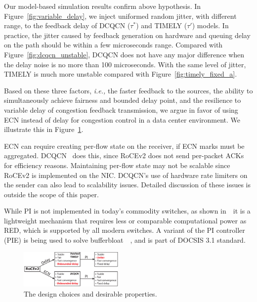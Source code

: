 Our model-based simulation results confirm above hypothesis. In Figure~\ref{fig:variable_delay}, we inject 
uniformed random jitter, with different range, to the feedback delay of DCQCN ($\tau^*$) 
and TIMELY ($\tau '$) models. In practice, the jitter caused by feedback generation on hardware 
and queuing delay on the path should be within a few microseconds range. Compared with 
Figure~\ref{fig:dcqcn_unstable}, DCQCN does not have any major difference when the delay noise is 
no more than 100 microseconds. With the same level of jitter, TIMELY is much more unstable compared
with Figure~\ref{fig:timely_fixed_a}.


Based on these three factors, {\em i.e.,} the faster feedback to the sources, 
the ability to simultaneously achieve fairness and bounded delay point, and the resilience 
to variable delay of congestion feedback transmission, we argue
in favor of using ECN instead of delay for congestion control in a data center
environment. We illustrate this in Figure~\ref{fig:design_choice}.

ECN can require creating per-flow state on the receiver, if ECN marks must be
aggregated. DCQCN~\cite{dcqcn} does this, since RoCEv2 does not send per-packet
ACKs for efficiency reasons. Maintaining per-flow state may not be scalable since
RoCEv2 is implemented on the NIC.  DCQCN's use of hardware rate limiters on the
sender can also lead to scalability issues.  Detailed discussion of these issues
is outside the scope of this paper.

While PI is not implemented in today's commodity switches, as shown
in~\cite{hollot2001designing}~it is a lightweight mechanism that requires less
or comparable computational power as RED, which is supported by all modern
switches. A variant of the PI controller (PIE) is being used to solve
bufferbloat~\cite{conf/hpsr/PanNPPSBV13,bufferbloat-pi}~, and is part of DOCSIS 3.1
standard.

\begin{figure}[t]
 \center
\includegraphics[width=0.45\textwidth]{figures/design_choice.eps}
\vspace{-0.5em}
 \caption{The design choices and desirable properties.}
\vspace{-1.5em}
\label{fig:design_choice}
\end{figure}


